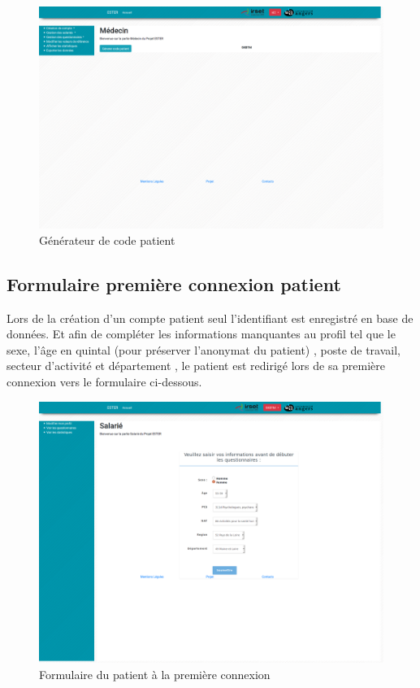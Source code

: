 \begin{figure}[H]
    \begin{center}
	\includegraphics[scale=0.25]{img/connexion/medecin}
    \end{center}
    \caption{Générateur de code patient}
\end{figure}

\subsection{Formulaire première connexion patient}

Lors de la création d’un compte patient seul l’identifiant est enregistré en base de données. Et afin de compléter les informations manquantes au profil tel que le sexe, l’âge en quintal (pour préserver l’anonymat du patient) , poste de travail, secteur d’activité et département , le patient est redirigé lors de sa première connexion vers le formulaire ci-dessous.

\begin{figure}[H]
    \begin{center}
	\includegraphics[scale=0.25]{img/connexion/formPatient}
    \end{center}
    \caption{Formulaire du patient à la première connexion}
\end{figure}